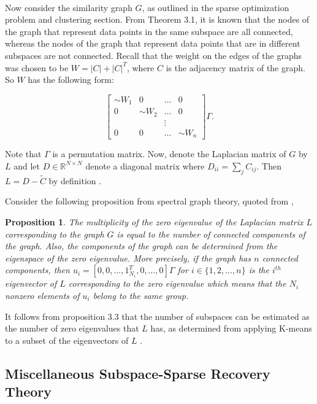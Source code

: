 \documentclass{article}
\newcommand{\R}{\mathbb{R}}
\newtheorem{proposition}[theorem]{Proposition}
\begin{document}
\ 

Now consider the similarity graph $G$, as outlined in the sparse optimization problem and clustering section. From Theorem 3.1, it is known that the nodes of the graph that represent data points in the same subspace are all connected, whereas the nodes of the graph that represent data points that are in different subspaces are not connected. Recall that the weight on the edges of the graphs was chosen to be $W = |C| + |C|^T$, where $C$ is the adjacency matrix of the graph. So $W$ has the following form:

\[ \begin{bmatrix} 
    \sim{W}_1 & 0 & \dots & 0 \\
    0 & \sim{W}_2 & \dots & 0 \\
    \ & \ & \vdots \\
    0 & 0 & \dots & \sim{W}_n
    \end{bmatrix} \Gamma.
\]

Note that $\Gamma$ is a permutation matrix. Now, denote the Laplacian matrix of $G$ by $L$ and let $D \in \R^{N \times N}$ denote a diagonal matrix where $D_{ii} = \sum_j C_{ij}$. Then $L = D - \tilde{C}$ by definition \cite{SSC-CVPR09-Ehsan}. 

Consider the following proposition from spectral graph theory,  quoted from \cite{SSC-CVPR09-Ehsan},

\begin{proposition}
The multiplicity of the zero eigenvalue of the Laplacian matrix $L$ corresponding to the graph $G$ is equal to the number of connected components of the graph. Also, the components of the graph can be determined from the eigenspace of the zero eigenvalue. More precisely, if the graph has $n$ connected components, then $u_i = [0, 0, \dots, 1_{N_i}^T, 0, \dots, 0]\Gamma$ for $i \in \{1, 2, \dots, n\}$ is the $i^{th}$ eigenvector of $L$ corresponding to the zero eigenvalue which means that the $N_i$ nonzero elements of $u_i$ belong to the same group.
\end{proposition}

It follows from proposition 3.3 that the number of subspaces can be estimated as the number of zero eigenvalues that $L$ has, as determined from applying K-means to a subset of the eigenvectors of $L$ \cite{SSC-CVPR09-Ehsan}.

\subsection{Miscellaneous Subspace-Sparse Recovery Theory}
\end{document}

